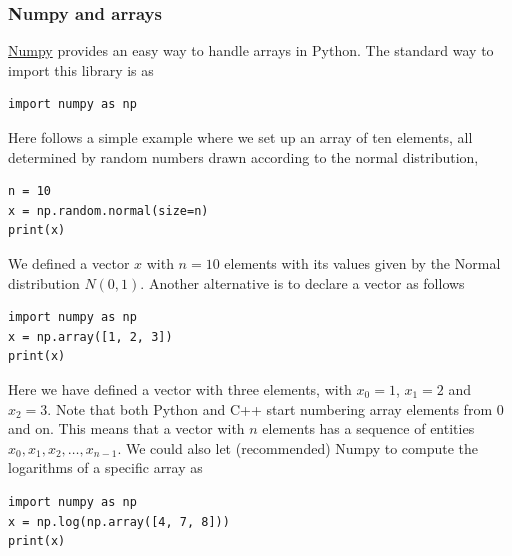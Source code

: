 \documentclass{beamer}
\begin{document}
\begin{frame}
\frametitle{Numpy and arrays}

\href{{http://www.numpy.org/}}{Numpy} provides an easy way to handle arrays in Python. The standard way to import this library is as



\begin{verbatim}
import numpy as np

\end{verbatim}

Here follows a simple example where we set up an array of ten elements, all determined by random numbers drawn according to the normal distribution,




\begin{verbatim}
n = 10
x = np.random.normal(size=n)
print(x)

\end{verbatim}

We defined a vector $x$ with $n=10$ elements with its values given by the Normal distribution $N(0,1)$.
Another alternative is to declare a vector as follows




\begin{verbatim}
import numpy as np
x = np.array([1, 2, 3])
print(x)

\end{verbatim}

Here we have defined a vector with three elements, with $x_0=1$, $x_1=2$ and $x_2=3$. Note that both Python and C++
start numbering array elements from $0$ and on. This means that a vector with $n$ elements has a sequence of entities $x_0, x_1, x_2, \dots, x_{n-1}$. We could also let (recommended) Numpy to compute the logarithms of a specific array as




\begin{verbatim}
import numpy as np
x = np.log(np.array([4, 7, 8]))
print(x)

\end{verbatim}



\end{frame}
\end{document}
